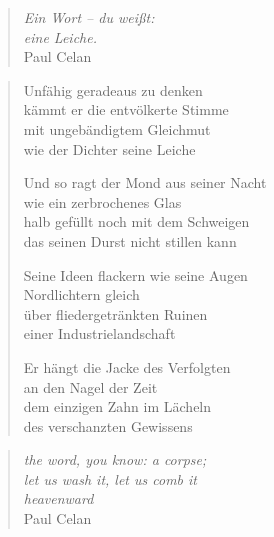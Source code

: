 
\cleartoverso


\begin{quote}
{\itshape Ein Wort -- du weißt:\\
eine Leiche.}\\
\hspace*{2em} Paul Celan
\end{quote}

\begin{verse}

Unfähig geradeaus zu denken\\
kämmt er die entvölkerte Stimme\\
mit ungebändigtem Gleichmut\\
wie der Dichter seine Leiche

Und so ragt der Mond aus seiner Nacht\\
wie ein zerbrochenes Glas\\
halb gefüllt noch mit dem Schweigen\\
das seinen Durst nicht stillen kann

Seine Ideen flackern wie seine Augen\\
Nordlichtern gleich\\
über fliedergetränkten Ruinen\\
einer Industrielandschaft

Er hängt die Jacke des Verfolgten\\
an den Nagel der Zeit\\
dem einzigen Zahn im Lächeln\\
des verschanzten Gewissens
\end{verse}

\clearpage


\begin{quote}
{\itshape the word, you know: a corpse;\\
let us wash it, let us comb it\\
heavenward}\\
\hspace*{2em} Paul Celan
\end{quote}

